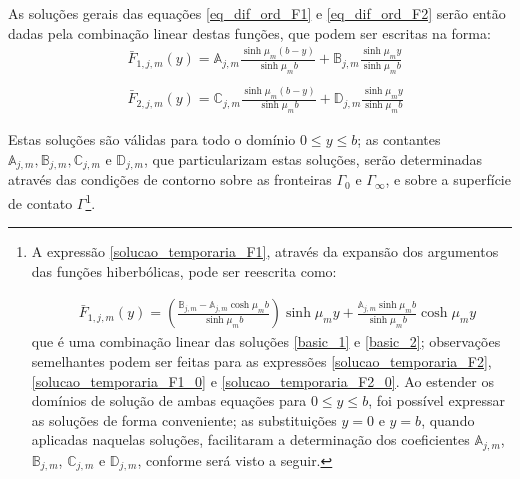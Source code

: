  


As soluções gerais das equações \eqref{eq_dif_ord_F1} e \eqref{eq_dif_ord_F2} serão então dadas pela combinação linear destas funções, que podem ser escritas na forma:
\begin{align}
& \bar{F}_{1,j,m}(y) = \mathbb{A}_{j,m}\frac{\sinh\mu_m (b - y)}{\sinh\mu_m b} + \mathbb{B}_{j,m}\frac{\sinh\mu_m y}{\sinh\mu_m b} \label{solucao_temporaria_F1}\\ \nonumber \\
& \bar{F}_{2,j,m}(y) = \mathbb{C}_{j,m}\frac{\sinh\mu_m (b - y)}{\sinh\mu_m b} + \mathbb{D}_{j,m}\frac{\sinh\mu_m y}{\sinh\mu_m b} \label{solucao_temporaria_F2}
\end{align} 

Estas soluções são válidas para todo o domínio $0 \le y \le b$; as contantes $\mathbb{A}_{j,m}, \mathbb{B}_{j,m}, \mathbb{C}_{j,m}$ e $\mathbb{D}_{j,m}$, que particularizam estas soluções, serão determinadas através das condições de contorno sobre as fronteiras $\Gamma_0$ e $\Gamma_\infty$, e sobre a superfície de contato $\Gamma$\footnote{A expressão \eqref{solucao_temporaria_F1}, através da expansão dos argumentos das funções hiberbólicas, pode ser reescrita como:
	
	\begin{align*}
	& \bar{F}_{1,j,m}(y) = \left( \frac{\mathbb{B}_{j,m} - \mathbb{A}_{j,m} \cosh\mu_m b}{\sinh\mu_m b}\right)\sinh\mu_m y + \frac{\mathbb{A}_{j,m}\sinh\mu_m b}{\sinh\mu_m b}\cosh\mu_m y
	\end{align*}	
	que é uma combinação linear das soluções \eqref{basic_1} e \eqref{basic_2}; observações semelhantes podem ser feitas para as expressões \eqref{solucao_temporaria_F2}, \eqref{solucao_temporaria_F1_0} e \eqref{solucao_temporaria_F2_0}. Ao estender os domínios de solução de ambas equações para $0 \le y \le b$, foi possível expressar as soluções de forma conveniente; as substituições $y = 0$ e $y = b$, quando aplicadas naquelas soluções, facilitaram a determinação dos coeficientes $\mathbb{A}_{j,m}$, $\mathbb{B}_{j,m}$, $\mathbb{C}_{j,m}$ e $\mathbb{D}_{j,m}$, conforme será visto a seguir.
	
	}.
	

